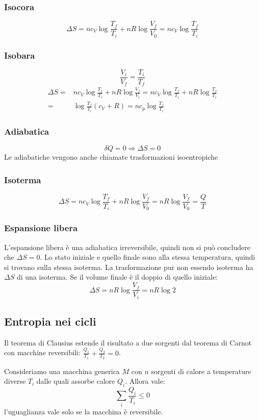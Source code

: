 \subsubsection{Isocora}
\[\Delta S=nc_V\log\frac{T_f}{T_i}+nR\log\frac{V_f}{V_0}=nc_V\log\frac{T_f}{T_i}\]
\subsubsection{Isobara}
\[\frac{V_i}{V_f}=\frac{T_i}{T_f}\]
\begin{align*}
   \Delta S= & nc_V\log\frac{T_f}{T_i}+nR\log\frac{V_f}{V_i}=nc_V\log\frac{T_f}{T_i}+nR\log\frac{T_f}{T_i} \\
   =         & \log\frac{T_f}{T_i}(c_V+R)=nc_p\log\frac{T_f}{T_i}
\end{align*}
\subsubsection{Adiabatica}
\[\delta Q=0 \Rightarrow \Delta S=0\]
Le adiabatiche vengono anche chiamate trasformazioni isoentropiche
\subsubsection{Isoterma}
\[\Delta S=nc_V\log\frac{T_f}{T_i}+nR\log\frac{V_f}{V_0}=nR\log\frac{V_f}{V_0}=\frac{Q}{T}\]
\subsubsection{Espansione libera}
L'espansione libera è una adiabatica irreversibile, quindi non si può concludere che $\Delta S=0$. Lo stato iniziale e quello finale sono alla stessa temperatura, quindi si trovano sulla stessa isoterma. La trasformazione pur non essendo isoterma ha $\Delta S$ di una isoterma. Se il volume finale è il doppio di quello iniziale:
\[\Delta S=nR\log\frac{V_f}{V_i}=nR\log 2\]

\subsection{Entropia nei cicli}
Il teorema di Clausius estende il risultato a due sorgenti dal teorema di Carnot con macchine reversibili: $\frac{Q_1}{T_1} + \frac{Q_2}{T_2} = 0$.
\begin{Teo}[Clausius]
   Consideriamo una macchina generica $M$ con $n$ sorgenti di calore a temperature diverse $T_i$ dalle quali assorbe calore $Q_i$. Allora vale:
   \begin{equation}
      \sum_i \frac{Q_i}{T_i} \leq 0
   \end{equation}
   l'uguaglianza vale solo se la macchina è reversibile.
\end{Teo}

